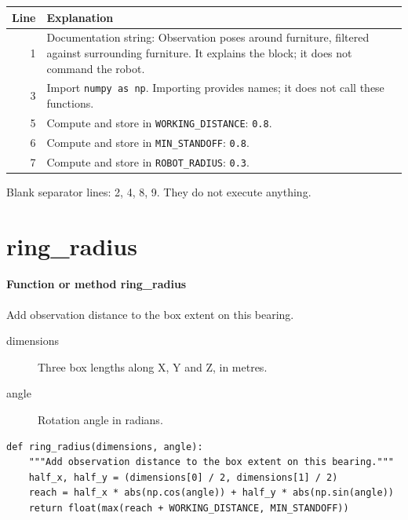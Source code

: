 \documentclass[11pt,a4paper]{book}
\begin{document}
\begin{longtable}{r p{}}

\textbf{Line} & \textbf{Explanation} \\ \hline \endhead

1 & Documentation string: Observation poses around furniture, filtered against surrounding furniture. It explains the block; it does not command the robot. \\

3 & Import \texttt{numpy as np}. Importing provides names; it does not call these functions. \\

5 & Compute and store in \texttt{WORKING\_DISTANCE}: \texttt{0.8}.  \\

6 & Compute and store in \texttt{MIN\_STANDOFF}: \texttt{0.8}.  \\

7 & Compute and store in \texttt{ROBOT\_RADIUS}: \texttt{0.3}.  \\

\end{longtable}

Blank separator lines: 2, 4, 8, 9. They do not execute anything.

\section{ring\_radius}

\paragraph{Function or method ring\_radius}
Add observation distance to the box extent on this bearing.

\begin{description}
\item[dimensions] Three box lengths along X, Y and Z, in metres.
\item[angle] Rotation angle in radians.
\end{description}

\begin{lstlisting}[firstnumber=10]
def ring_radius(dimensions, angle):
    """Add observation distance to the box extent on this bearing."""
    half_x, half_y = (dimensions[0] / 2, dimensions[1] / 2)
    reach = half_x * abs(np.cos(angle)) + half_y * abs(np.sin(angle))
    return float(max(reach + WORKING_DISTANCE, MIN_STANDOFF))


\end{lstlisting}
\end{document}
